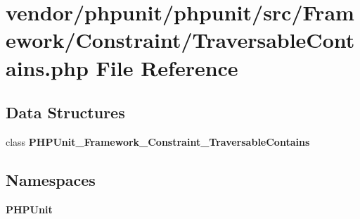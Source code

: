 \section{vendor/phpunit/phpunit/src/\+Framework/\+Constraint/\+Traversable\+Contains.php File Reference}
\label{_traversable_contains_8php}
\subsection*{Data Structures}
\begin{DoxyCompactItemize}
\item 
class {\bf P\+H\+P\+Unit\+\_\+\+Framework\+\_\+\+Constraint\+\_\+\+Traversable\+Contains}
\end{DoxyCompactItemize}
\subsection*{Namespaces}
\begin{DoxyCompactItemize}
\item 
 {\bf P\+H\+P\+Unit}
\end{DoxyCompactItemize}
